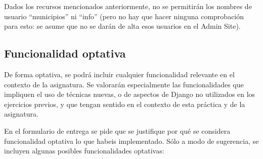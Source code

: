 Dados los recursos mencionados anteriormente, no se permitirán los nombres de usuario ``municipios'' ni ``info'' (pero no hay que hacer ninguna comprobación para esto: se asume que no se darán de alta esos usuarios en el Admin Site).


\subsection{Funcionalidad optativa}

De forma optativa, se podrá incluir cualquier funcionalidad relevante en el contexto de la asignatura. Se valorarán especialmente las funcionalidades que impliquen el uso de técnicas nuevas, o de aspectos de Django no utilizados en los ejercicios previos, y que tengan sentido en el contexto de esta práctica y de la asignatura.

En el formulario de entrega se pide que se justifique por qué se considera funcionalidad optativa lo que habeis implementado. Sólo a modo de sugerencia, se incluyen algunas posibles funcionalidades optativas:


